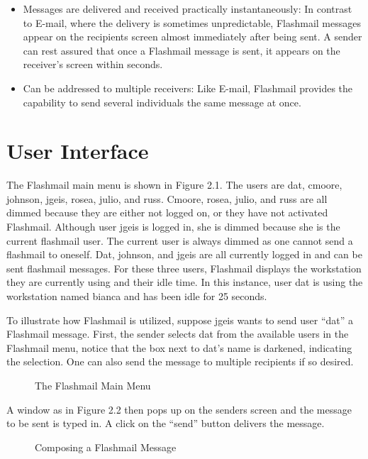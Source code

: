 \begin{itemize}
\item Messages are delivered and received practically instantaneously: In
  contrast to E-mail, where the delivery is sometimes unpredictable,
  Flashmail messages appear on the recipients screen almost immediately
  after being sent.  A sender can rest assured that once a Flashmail
  message is sent, it appears on the receiver's screen within seconds.

\item Can be addressed to multiple receivers: Like E-mail, Flashmail
  provides the capability to send several individuals the same message at
  once.
\end{itemize}

\newpage
\section{User Interface}
The Flashmail main menu is shown in Figure 2.1.  The users are dat, cmoore,
johnson, jgeis, rosea, julio, and russ.  Cmoore, rosea, julio, and russ are
all dimmed because they are either not logged on, or they have not
activated Flashmail.  Although user jgeis is logged in, she is dimmed
because she is the current flashmail user. The current user is always
dimmed as one cannot send a flashmail to oneself. Dat, johnson, and jgeis
are all currently logged in and can be sent flashmail messages.  For these
three users, Flashmail displays the workstation they are currently using
and their idle time.  In this instance, user dat is using the workstation
named bianca and has been idle for 25 seconds.

To illustrate how Flashmail is utilized, suppose jgeis wants to
send user ``dat'' a Flashmail message.  First, the sender selects dat from
the available users in the Flashmail menu, notice that the box next to
dat's name is darkened, indicating the selection.  One can also send the
message to multiple recipients if so desired.

\begin{figure}[htb]
  {\centerline{}}
  \caption{The Flashmail Main Menu}
  \label{Main-menu}
\end{figure}


A window as in Figure 2.2 then pops up on the senders screen and the
message to be sent is typed in. A click on the ``send'' button delivers the
message.

\begin{figure}[htb]
  {\centerline{}}
  \caption{Composing a Flashmail Message}
  \label{Compose}
\end{figure}

